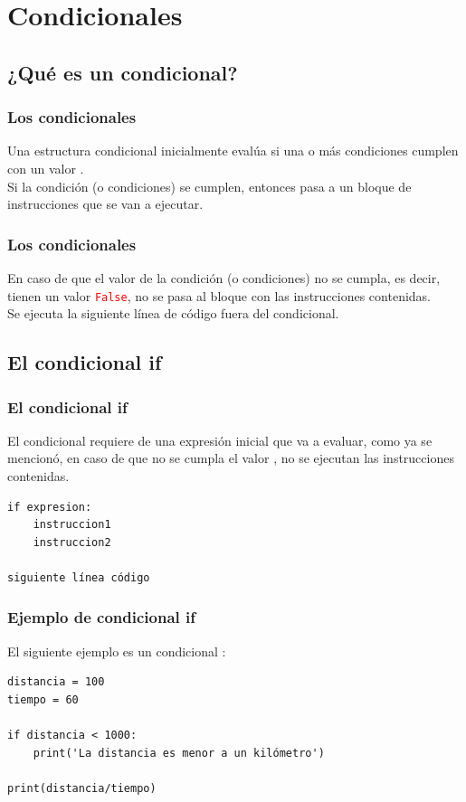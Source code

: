 \documentclass[12pt]{beamer}
\begin{document}
\section{Condicionales}
\subsection{¿Qué es un condicional?}

\begin{frame}
\frametitle{Los condicionales}
Una estructura condicional inicialmente evalúa si una o más condiciones cumplen con un valor .
\\
\bigskip
\pause
Si la condición (o condiciones) se cumplen, entonces pasa a un bloque de instrucciones que se van a ejecutar.
\end{frame}
\begin{frame}
\frametitle{Los condicionales}    
En caso de que el valor de la condición (o condiciones) no se cumpla, \pause es decir, tienen un valor \textcolor{red}{\texttt{False}}, \pause no se pasa al bloque con las instrucciones contenidas.
\\
\bigskip
\pause
Se ejecuta la siguiente línea de código fuera del condicional.
\end{frame}

\subsection{El condicional if}

\begin{frame}[fragile]
\frametitle{El condicional if}
El condicional  requiere de una expresión inicial que va a evaluar, como ya se mencionó, en caso de que no se cumpla el valor , no se ejecutan las instrucciones contenidas.
\begin{verbatim}
if expresion:
    instruccion1
    instruccion2

siguiente línea código
\end{verbatim}
\end{frame}
\begin{frame}[fragile]
\frametitle{Ejemplo de condicional if}
El siguiente ejemplo es un condicional :
\pause
\begin{lstlisting}[caption=La estructura condicional if]
distancia = 100
tiempo = 60

if distancia < 1000:
    print('La distancia es menor a un kilómetro')

print(distancia/tiempo)
\end{lstlisting}
\end{frame}
\end{document}
